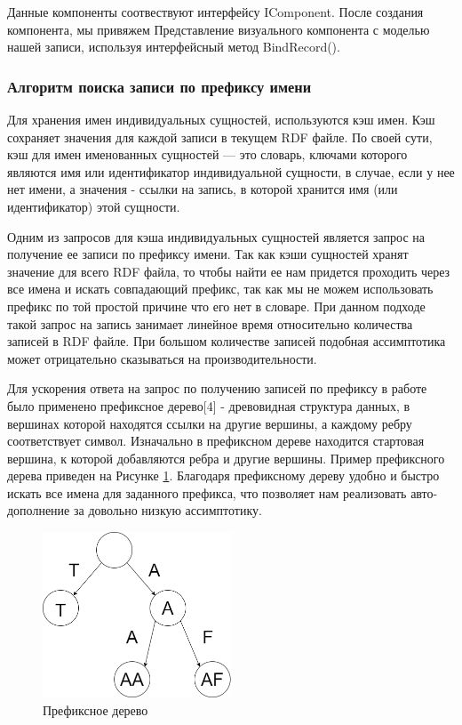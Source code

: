 \documentclass[12pt]{article}
\begin{document}
Данные компоненты соотвествуют интерфейсу IComponent. После создания компонента, мы привяжем Представление визуального компонента с моделью нашей записи, используя интерфейсный метод BindRecord().

\subsubsection{Алгоритм поиска записи по префиксу имени}
\qquad Для хранения имен индивидуальных сущностей, используются кэш имен. Кэш сохраняет значения для каждой записи в текущем RDF файле. По своей сути, кэш для имен именованных сущностей — это словарь, ключами которого являются имя или идентификатор индивидуальной сущности, в случае, если у нее нет имени, а значения - ссылки на запись, в которой хранится имя (или идентификатор) этой сущности.

Одним из запросов для кэша индивидуальных сущностей является запрос на получение ее записи по префиксу имени. Так как кэши сущностей хранят значение для всего RDF файла, то чтобы найти ее нам придется проходить через все имена и искать совпадающий префикс, так как мы не можем использовать префикс по той простой причине что его нет в словаре. При данном подходе такой запрос на запись занимает линейное время относительно количества записей в RDF файле. При большом количестве записей подобная ассимптотика может отрицательно сказываться на производительности.

Для ускорения ответа на запрос по получению записей по префиксу в работе было применено префиксное дерево[4] - древовидная структура данных, в вершинах которой находятся ссылки на другие вершины, а каждому ребру соответствует символ. Изначально в префиксном дереве находится стартовая вершина, к которой добавляются ребра и другие вершины. Пример префиксного дерева приведен на Рисунке \ref{fig:prefix_tree}. Благодаря префиксному дереву удобно и быстро искать все имена для заданного префикса, что позволяет нам реализовать авто-дополнение за довольно низкую ассимптотику.

\begin{figure}[!ht]
    \centering
    \includegraphics[width=0.5\textwidth]{_images/prefix_tree.png}
    \caption{Префиксное дерево}
    \label{fig:prefix_tree}
\end{figure}
\end{document}
